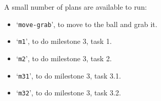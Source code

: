 \documentclass[12pt,a4paper]{article}
\begin{document}
A small number of plans are available to run:

\begin{itemize}
    \item `\texttt{move-grab}', to move to the ball and grab it.
    \item `\texttt{m1}', to do milestone 3, task 1.
    \item `\texttt{m2}', to do milestone 3, task 2.
    \item `\texttt{m31}', to do milestone 3, task 3.1.
    \item `\texttt{m32}', to do milestone 3, task 3.2.
\end{itemize}








\end{document}
